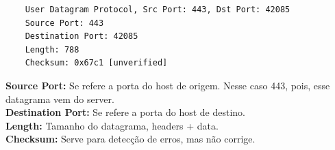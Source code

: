 
\begin{solution}
    \begin{verbatim}
    User Datagram Protocol, Src Port: 443, Dst Port: 42085
    Source Port: 443
    Destination Port: 42085
    Length: 788
    Checksum: 0x67c1 [unverified]
    \end{verbatim}

    \textbf{Source Port:} Se refere a porta do host de origem. Nesse caso 443, pois, esse datagrama vem do server.\\
    \textbf{Destination Port:} Se refere a porta do host de destino.\\
    \textbf{Length:} Tamanho do datagrama, headers + data.\\
    \textbf{Checksum:} Serve para detecção de erros, mas não corrige.\\
\end{solution}